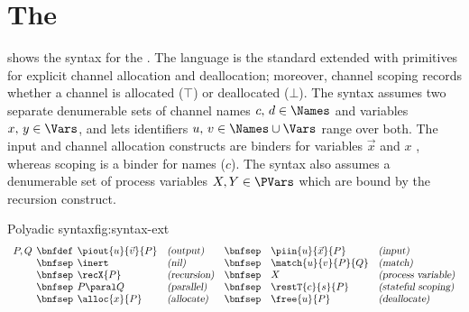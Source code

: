 \documentclass[copyright]{eptcs}
\begin{document}
\section{The \picR}

 shows the syntax for the \picr. The language is the
standard \pic extended with primitives for explicit channel allocation and
deallocation; moreover, channel scoping records whether a channel is allocated
($\top$) or deallocated ($\bot$).  The syntax assumes two separate denumerable
sets of channel names $c,\,d\in \Names$ and variables $x,\,y\in\Vars$, and lets
identifiers $u,\,v \in \Names\cup\Vars$ range over both.  The input and channel
allocation constructs are binders for variables $\vec{x}$ and $x$ \resp,
whereas scoping is a binder for names (\ie $c$).  The syntax also assumes a
denumerable set of process variables $X,Y \in \PVars$ which are bound by the
recursion construct. 

\begin{display}{Polyadic \picr syntax}{fig:syntax-ext}
\begin{equation*}
\begin{array}{l@{\hspace{1ex}}r@{\hspace{1ex}}lllllllllll}
P, Q & \bnfdef & \piout{u}{\vec{v}}{P} & \textsl{(output)}    & \bnfsep & \piin{u}{\vec{x}}{P} & \textsl{(input)}    \\ 
     & \bnfsep & \inert                & \textsl{(nil)}       & \bnfsep & \match{u}{v}{P}{Q}   & \textsl{(match)}    \\       
     & \bnfsep & \recX{P}              & \textsl{(recursion)} & \bnfsep & X                    & \textsl{(process variable)} \\              
     & \bnfsep & P \paral Q            & \textsl{(parallel)}  & \bnfsep & \restT{c}{s}{P}      & \textsl{(stateful scoping)} \\
     & \bnfsep & \alloc{x}{P}          & \textsl{(allocate)}  & \bnfsep & \free{u}{P}          & \textsl{(deallocate)}       \\
\end{array}
\end{equation*}
\end{display}
\end{document}
